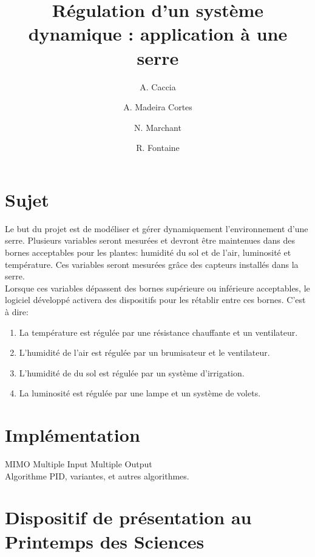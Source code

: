\documentclass[a4paper,10pt]{article}
\title{Régulation d'un système dynamique : application à une serre}
\author{A. Caccia \and A. Madeira Cortes \and N. Marchant \and R. Fontaine}
\date{ }
\begin{document}
\maketitle

\vspace{1cm}

\section{Sujet}

Le but du projet est de modéliser et gérer dynamiquement l'environnement d'une serre. Plusieurs variables seront mesurées et devront être maintenues dans des bornes acceptables pour les plantes: humidité du sol et de l'air, luminosité et température. Ces variables seront mesurées grâce des capteurs installés dans la serre. \\

Lorsque ces variables dépassent des bornes supérieure ou inférieure acceptables, le logiciel développé activera des dispositifs pour les rétablir entre ces bornes. C'est à dire: \\

\begin{enumerate}
	\item La température est régulée par une résistance chauffante et un ventilateur.
	\item L'humidité de l'air est régulée par un brumisateur et le ventilateur.
	\item L'humidité de du sol est régulée par un système d'irrigation.
	\item La luminosité est régulée par une lampe et un système de volets.\\
\end{enumerate}

\newpage

\section{Implémentation}

MIMO Multiple Input Multiple Output \\

Algorithme PID, variantes, et autres algorithmes.\\

\section{Dispositif de présentation au Printemps des Sciences}
\end{document}
